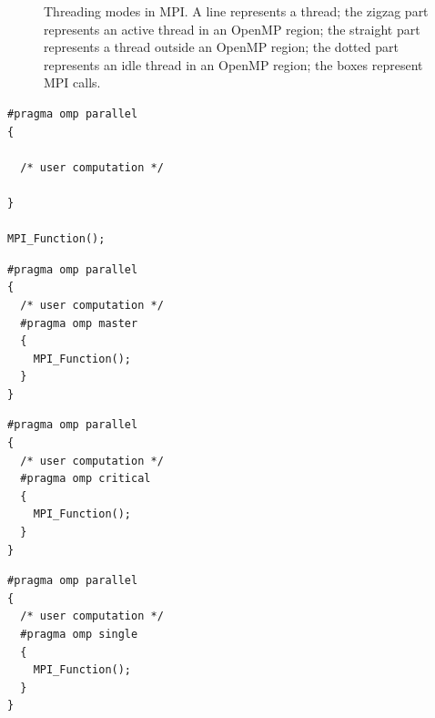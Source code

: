 \begin{figure}
{    \label{fig:th_mode_mt}
  }
  \hspace{0.05\columnwidth}
  \vspace{-2.0ex}
  \caption{Threading modes in MPI.  A line represents a thread; the
    zigzag part represents an active thread in an OpenMP region; the
    straight part represents a thread outside an OpenMP region; the
    dotted part represents an idle thread in an OpenMP region; the
    boxes represent MPI calls.}
  \label{fig:th_modes}
  \vspace{-3.0ex}
\end{figure}


\newsavebox\mpiOutsideBox
\begin{lrbox}{\mpiOutsideBox}
\begin{lstlisting}[linewidth=0.45\columnwidth]
#pragma omp parallel
{

  /* user computation */

}

MPI_Function();
\end{lstlisting}
\end{lrbox}

\newsavebox\mpiInsideMasterBox
\begin{lrbox}{\mpiInsideMasterBox}
\begin{lstlisting}[linewidth=0.45\columnwidth]
#pragma omp parallel
{
  /* user computation */
  #pragma omp master
  {
    MPI_Function();
  }
}
\end{lstlisting}
\end{lrbox}

\newsavebox\mpiInsideCriticalBox
\begin{lrbox}{\mpiInsideCriticalBox}
\begin{lstlisting}[linewidth=0.45\columnwidth]
#pragma omp parallel
{
  /* user computation */
  #pragma omp critical
  {
    MPI_Function();
  }
}
\end{lstlisting}
\end{lrbox}

\newsavebox\mpiInsideSingleBox
\begin{lrbox}{\mpiInsideSingleBox}
\begin{lstlisting}[linewidth=0.45\columnwidth]
#pragma omp parallel
{
  /* user computation */
  #pragma omp single
  {
    MPI_Function();
  }
}
\end{lstlisting}
\end{lrbox}

